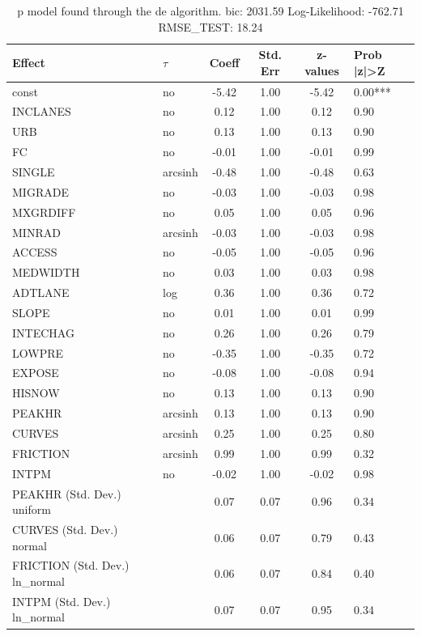 \begin{table}
	\caption{p model found through the de algorithm. bic: 2031.59 Log-Likelihood: -762.71 RMSE_TEST: 18.24}
	\begin{center}
		\begin{tabular}{|l|l|c|c|c|l|}
			\hline
			Effect & $\tau$ & Coeff & Std. Err & z-values & Prob |z|>Z \\
			\hline
			const & no & -5.42 & 1.00 & -5.42 & 0.00*** \\
			\hline
			INCLANES & no & 0.12 & 1.00 & 0.12 & 0.90 \\
			\hline
			URB & no & 0.13 & 1.00 & 0.13 & 0.90 \\
			\hline
			FC & no & -0.01 & 1.00 & -0.01 & 0.99 \\
			\hline
			SINGLE & arcsinh & -0.48 & 1.00 & -0.48 & 0.63 \\
			\hline
			MIGRADE & no & -0.03 & 1.00 & -0.03 & 0.98 \\
			\hline
			MXGRDIFF & no & 0.05 & 1.00 & 0.05 & 0.96 \\
			\hline
			MINRAD & arcsinh & -0.03 & 1.00 & -0.03 & 0.98 \\
			\hline
			ACCESS & no & -0.05 & 1.00 & -0.05 & 0.96 \\
			\hline
			MEDWIDTH & no & 0.03 & 1.00 & 0.03 & 0.98 \\
			\hline
			ADTLANE & log & 0.36 & 1.00 & 0.36 & 0.72 \\
			\hline
			SLOPE & no & 0.01 & 1.00 & 0.01 & 0.99 \\
			\hline
			INTECHAG & no & 0.26 & 1.00 & 0.26 & 0.79 \\
			\hline
			LOWPRE & no & -0.35 & 1.00 & -0.35 & 0.72 \\
			\hline
			EXPOSE & no & -0.08 & 1.00 & -0.08 & 0.94 \\
			\hline
			HISNOW & no & 0.13 & 1.00 & 0.13 & 0.90 \\
			\hline
			PEAKHR & arcsinh & 0.13 & 1.00 & 0.13 & 0.90 \\
			\hline
			CURVES & arcsinh & 0.25 & 1.00 & 0.25 & 0.80 \\
			\hline
			FRICTION & arcsinh & 0.99 & 1.00 & 0.99 & 0.32 \\
			\hline
			INTPM & no & -0.02 & 1.00 & -0.02 & 0.98 \\
			\hline
			PEAKHR (Std. Dev.) uniform &  & 0.07 & 0.07 & 0.96 & 0.34 \\
			\hline
			CURVES (Std. Dev.) normal &  & 0.06 & 0.07 & 0.79 & 0.43 \\
			\hline
			FRICTION (Std. Dev.) ln_normal &  & 0.06 & 0.07 & 0.84 & 0.40 \\
			\hline
			INTPM (Std. Dev.) ln_normal &  & 0.07 & 0.07 & 0.95 & 0.34 \\
			\hline
		\end{tabular}
	\end{center}
\end{table}